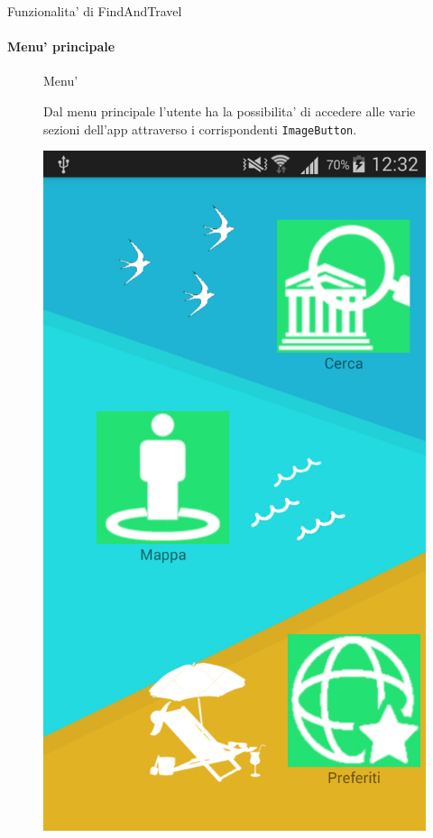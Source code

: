 \documentclass[10pt,a4paper]{beamer}
\begin{document}
\begin{frame}{Funzionalita' di FindAndTravel}
\framesubtitle{Menu' principale}
\begin{figure}
\begin{minipage}{0.45\textwidth}
 \begin{block}{Menu'}
 
 Dal menu principale l'utente ha la possibilita' di accedere alle varie sezioni dell'app attraverso i corrispondenti \texttt{ImageButton}.    
 \end{block}
\end{minipage}
\hfill
\begin{minipage}{0.35\textwidth}
  \includegraphics[scale=0.1]{menu.png}
\end{minipage}
\end{figure}

\end{frame}
\end{document}
